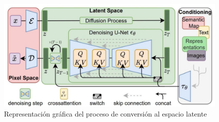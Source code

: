 \begin{figure}[h]
	\centering
	\includegraphics[width = 1
	\textwidth]{Imagenes/Vectorial/espaciolatente.png}
	\caption{Representación gráfica del proceso de conversión al espacio latente}
	\label{fig:latentspace}
\end{figure}

